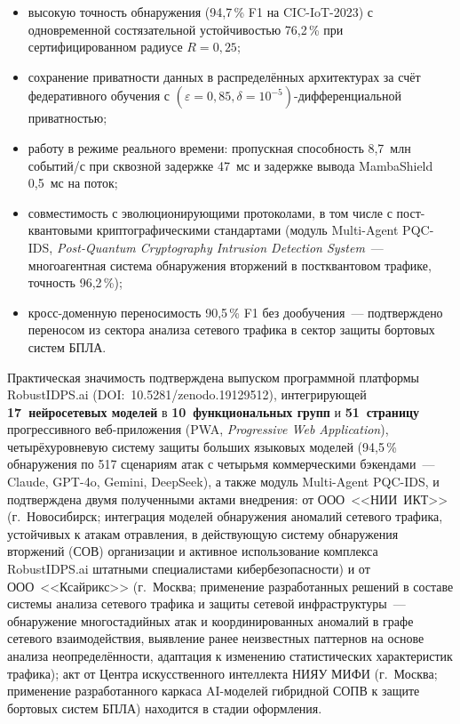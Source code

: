 \documentclass[12pt,a5paper]{article}
\begin{document}
\begin{itemize}
\item высокую точность обнаружения (94,7\,\% F1 на
CIC-IoT-2023) с одновременной состязательной устойчивостью
76,2\,\% при сертифицированном радиусе $R{=}0{,}25$;
\item сохранение приватности данных в распределённых
архитектурах за счёт федеративного обучения с
$(\varepsilon{=}0{,}85,\delta{=}10^{-5})$-дифференциальной
приватностью;
\item работу в режиме реального времени: пропускная
способность 8,7~млн событий/с при сквозной задержке 47~мс
и задержке вывода MambaShield 0,5~мс на поток;
\item совместимость с эволюционирующими протоколами, в том
числе с пост-квантовыми криптографическими стандартами
(модуль Multi-Agent PQC-IDS,
\emph{Post-Quantum Cryptography Intrusion Detection
System}~--- многоагентная система обнаружения вторжений в
постквантовом трафике, точность 96,2\,\%);
\item кросс-доменную переносимость 90,5\,\% F1 без
дообучения~--- подтверждено переносом из сектора анализа
сетевого трафика в сектор защиты бортовых систем БПЛА.
\end{itemize}

Практическая значимость подтверждена выпуском программной
платформы RobustIDPS.ai (DOI:~10.5281/zenodo.19129512),
интегрирующей \textbf{17~нейросетевых моделей} в
\textbf{10~функциональных групп} и \textbf{51~страницу}
прогрессивного веб-приложения (PWA,
\emph{Progressive Web Application}), четырёхуровневую
систему защиты больших языковых моделей (94,5\,\%
обнаружения по 517 сценариям атак с четырьмя коммерческими
бэкендами~--- Claude, GPT-4o, Gemini, DeepSeek), а также
модуль Multi-Agent PQC-IDS, и подтверждена двумя
полученными актами внедрения: от ООО~<<НИИ~ИКТ>>
(г.~Новосибирск; интеграция моделей обнаружения аномалий
сетевого трафика, устойчивых к атакам отравления, в
действующую систему обнаружения вторжений (СОВ) организации
и активное использование комплекса RobustIDPS.ai штатными
специалистами кибербезопасности) и от ООО~<<Ксайрикс>>
(г.~Москва; применение разработанных решений в составе
системы анализа сетевого трафика и защиты сетевой
инфраструктуры~--- обнаружение многостадийных атак и
координированных аномалий в графе сетевого взаимодействия,
выявление ранее неизвестных паттернов на основе анализа
неопределённости, адаптация к изменению статистических
характеристик трафика); акт от Центра искусственного
интеллекта НИЯУ МИФИ (г.~Москва; применение разработанного
каркаса AI-моделей гибридной СОПВ к защите бортовых систем
БПЛА) находится в стадии оформления.
\end{document}
